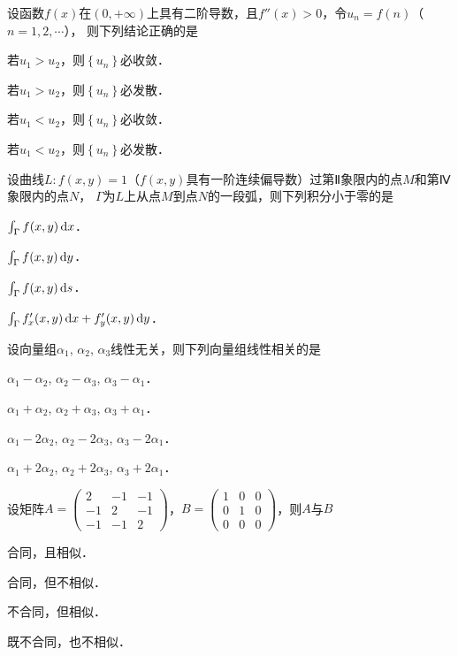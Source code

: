 \documentclass[plain,noanswer,medmath]{../../template/jnuexam}
\begin{document}
\begin{problem}
设函数$f(x)$在$(0, +\infty)$上具有二阶导数，且$f''(x) > 0$，令$u_n = f(n)$（$n=1,2,\cdots$），
则下列结论正确的是\pickout{}
\begin{abcd}
\item 若$u_1 > u_2$，则$\left\{u_n \right\}$必收敛．
\item 若$u_1 > u_2$，则$\left\{u_n \right\}$必发散．
\item 若$u_1 < u_2$，则$\left\{u_n \right\}$必收敛．
\item 若$u_1 < u_2$，则$\left\{u_n \right\}$必发散．
\end{abcd}
\end{problem}


\begin{problem}
设曲线$L:f(x,y) = 1$（$f(x,y)$具有一阶连续偏导数）过第Ⅱ象限内的点$M$和第Ⅳ象限内的点$N$，
$\Gamma$为$L$上从点$M$到点$N$的一段弧，则下列积分小于零的是\pickout{}
\begin{abcd}
\item $\int_{\Gamma}f(x,y)\mathop{}\!\mathrm{d} x$．
\item $\int_{\Gamma}f(x,y)\mathop{}\!\mathrm{d} y$．
\item $\int_{\Gamma}f(x,y)\mathop{}\!\mathrm{d} s$．
\item $\int_{\Gamma}f'_x(x,y)\mathop{}\!\mathrm{d} x + f'_y(x,y)\mathop{}\!\mathrm{d} y$．
\end{abcd}
\end{problem}


\begin{problem}
设向量组$\alpha_1$, $\alpha_2$, $\alpha_3$线性无关，则下列向量组线性相关的是\pickout{}
\begin{abcd}
\item $\alpha_1 - \alpha_2$, $\alpha_2 - \alpha_3$, $\alpha_3 - \alpha_1$．
\item $\alpha_1 + \alpha_2$, $\alpha_2 + \alpha_3$, $\alpha_3 + \alpha_1$．
\item $\alpha_1 - 2\alpha_2$, $\alpha_2 - 2\alpha_3$, $\alpha_3 - 2\alpha_1$．
\item $\alpha_1 + 2\alpha_2$, $\alpha_2 + 2\alpha_3$, $\alpha_3 + 2\alpha_1$．
\end{abcd}
\end{problem}


\begin{problem}
设矩阵$A = \begin{pmatrix}
   2 & -1 & -1 \\
  -1 &  2 & -1 \\
  -1 & -1 & 2
\end{pmatrix}$，$B = \begin{pmatrix}
  1 & 0 & 0 \\
  0 & 1 & 0 \\
  0 & 0 & 0
\end{pmatrix}$，则$A$与$B$\pickout{}
\begin{abcd}
\item 合同，且相似．
\item 合同，但不相似．
\item 不合同，但相似．
\item 既不合同，也不相似．
\end{abcd}
\end{problem}
\end{document}
